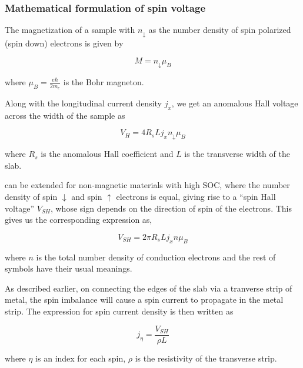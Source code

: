 \subsubsection{Mathematical formulation of spin voltage}

The magnetization of a sample with \( n_{\downarrow} \) as the number density of spin polarized (spin down) electrons is given by

\begin{equation}
    M = n_{\downarrow} \mu_B
\end{equation}

where \( \mu_B = \displaystyle \frac{e \hbar}{2 m_e}\) is the Bohr magneton.

Along with the longitudinal current density \( j_x \), we get an anomalous Hall voltage across the width of the sample as

\begin{equation} \label{eq:ano-hall-voltage}
    V_H = 4 R_s L j_x n_{\downarrow} \mu_B
\end{equation}

where \( R_s \) is the anomalous Hall coefficient and \( L \) is the transverse width of the slab.

 can be extended for non-magnetic materials with high SOC, where the number density of spin \( \downarrow \) and spin \( \uparrow \) electrons is equal, giving rise to a ``spin Hall voltage'' \( V_{SH} \), whose sign depends on the direction of spin of the electrons.
This gives us the corresponding expression as,

\begin{equation} \label{eq:spin-voltage}
    V_{SH} = 2 \pi R_s L j_x n \mu_B
\end{equation}

where \( n \) is the total number density of conduction electrons and the rest of symbols have their usual meanings.

As described earlier, on connecting the edges of the slab via a tranverse strip of metal, the spin imbalance will cause a spin current to propagate in the metal strip.
The expression for spin current density is then written as

\begin{equation} \label{eq:j_eta}
    j_\eta = \frac{V_{SH}}{\rho L}
\end{equation}

where \( \eta \) is an index for each spin, \( \rho \) is the resistivity of the transverse strip.

